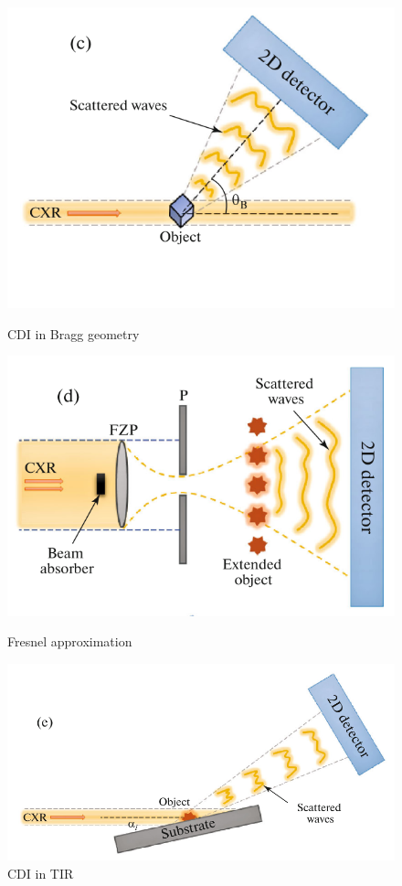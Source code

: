 \documentclass{article}
\begin{document}
\begin{figure}[h!]
    \begin{minipage}{0.5\textwidth}
        \includegraphics[width=\textwidth]{braggs-geometryy.png}
        \caption{CDI in Bragg geometry}
    \end{minipage}%
    \begin{minipage}{0.5\textwidth}
        \includegraphics[width=\textwidth]{Fresnel approximation.png}
        \caption{Fresnel approximation}
    \end{minipage}

    \includegraphics[width=\textwidth]{TER_geometry.png}
    \caption{CDI in TIR}
\end{figure}
\end{document}
